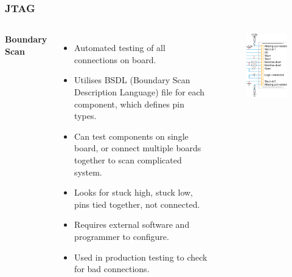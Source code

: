 \documentclass[t]{beamer}
\begin{document}

\begin{frame}[t]
\frametitle{JTAG}

\begin{columns}
	\textbf{Boundary Scan}
	\begin{itemize}
		\item Automated testing of all connections on board.
		\item Utilises BSDL (Boundary Scan Description Language) file for each component, which defines pin types. 
		\item Can test components on single board, or connect multiple boards together to scan complicated system. 
		\item Looks for stuck high, stuck low, pins tied together, not connected. 
		\item Requires external software and programmer to configure. 
		\item Used in production testing to check for bad connections.
	\end{itemize}
	
	\begin{figure}
		\includegraphics[width=\linewidth]{boundaryScanFaults.png}
	\end{figure}
\end{columns}


\end{frame}
\end{document}
